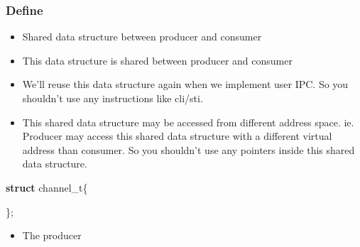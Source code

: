 \documentclass[]{book}
\newenvironment{Shaded}{}{}
\newcommand{\KeywordTok}[1]{\textbf{{#1}}}
\newcommand{\NormalTok}[1]{{#1}}
\begin{document}
\subsubsection*{Define}\label{define-8}

\begin{itemize}
\itemsep1pt\parskip0pt
\item
  Shared data structure between producer and consumer
\item
  This data structure is shared between producer and consumer
\item
  We'll reuse this data structure again when we implement user IPC. So
  you shouldn't use any instructions like cli/sti.
\item
  This shared data structure may be accessed from different address
  space. ie. Producer may access this shared data structure with a
  different virtual address than consumer. So you shouldn't use any
  pointers inside this shared data structure.
\end{itemize}

\begin{Shaded}
\begin{Highlighting}[]
\KeywordTok{struct} \NormalTok{channel_t\{}

\NormalTok{\};}
\end{Highlighting}
\end{Shaded}

\begin{itemize}
\itemsep1pt\parskip0pt
\item
  The producer
\end{itemize}
\end{document}
